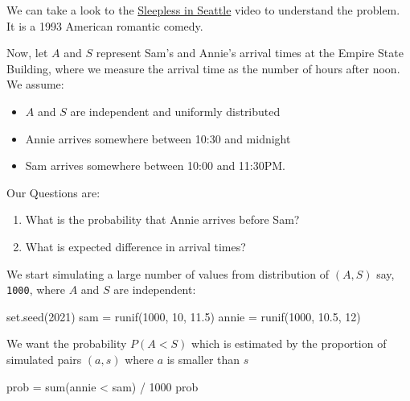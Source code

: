 \documentclass[
]{book}
\newenvironment{Shaded}{\begin{snugshade}}{\end{snugshade}}
\newcommand{\DecValTok}[1]{\textcolor[rgb]{0.00,0.00,0.81}{#1}}
\newcommand{\FloatTok}[1]{\textcolor[rgb]{0.00,0.00,0.81}{#1}}
\newcommand{\FunctionTok}[1]{\textcolor[rgb]{0.00,0.00,0.00}{#1}}
\newcommand{\NormalTok}[1]{#1}
\newcommand{\OtherTok}[1]{\textcolor[rgb]{0.56,0.35,0.01}{#1}}
\newcommand{\SpecialCharTok}[1]{\textcolor[rgb]{0.00,0.00,0.00}{#1}}
\providecommand{\tightlist}{%
  \setlength{\itemsep}{0pt}\setlength{\parskip}{0pt}}
\theoremstyle{definition}
\theoremstyle{definition}
\theoremstyle{definition}
\theoremstyle{definition}
\theoremstyle{remark}
\begin{document}
We can take a look to the \href{https://www.youtube.com/watch?v=L4Ll-xXjjXc}{Sleepless in Seattle} video to understand the problem. It is a 1993 American romantic comedy.

Now, let \(A\) and \(S\) represent Sam's and Annie's arrival times at the Empire State Building, where we measure the arrival time as the number of hours after noon. We assume:

\begin{itemize}
\tightlist
\item
  \(A\) and \(S\) are independent and uniformly distributed
\item
  Annie arrives somewhere between 10:30 and midnight
\item
  Sam arrives somewhere between 10:00 and 11:30PM.
\end{itemize}

Our Questions are:

\begin{enumerate}
\def\labelenumi{\arabic{enumi})}
\tightlist
\item
  What is the probability that Annie arrives before Sam?
\item
  What is expected difference in arrival times?
\end{enumerate}

We start simulating a large number of values from distribution of \((A,S)\) say, \texttt{1000}, where \(A\) and \(S\) are independent:

\begin{Shaded}
\begin{Highlighting}[]
\FunctionTok{set.seed}\NormalTok{(}\DecValTok{2021}\NormalTok{)}
\NormalTok{sam }\OtherTok{=} \FunctionTok{runif}\NormalTok{(}\DecValTok{1000}\NormalTok{, }\DecValTok{10}\NormalTok{, }\FloatTok{11.5}\NormalTok{)}
\NormalTok{annie }\OtherTok{=} \FunctionTok{runif}\NormalTok{(}\DecValTok{1000}\NormalTok{, }\FloatTok{10.5}\NormalTok{, }\DecValTok{12}\NormalTok{)}
\end{Highlighting}
\end{Shaded}

We want the probability \(P(A < S)\) which is estimated by the proportion of simulated pairs \((a,s)\) where \(a\) is smaller than \(s\)

\begin{Shaded}
\begin{Highlighting}[]
\NormalTok{prob }\OtherTok{=} \FunctionTok{sum}\NormalTok{(annie }\SpecialCharTok{\textless{}}\NormalTok{ sam) }\SpecialCharTok{/} \DecValTok{1000}
\NormalTok{prob}
\end{Highlighting}
\end{Shaded}
\end{document}
